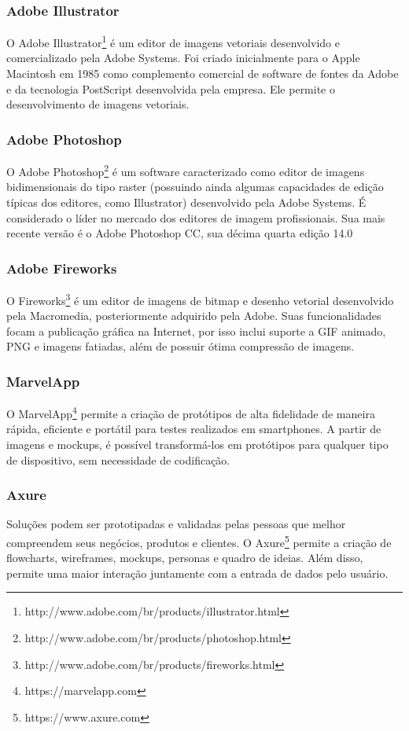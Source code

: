 \subsubsection{Adobe Illustrator}
O Adobe Illustrator\footnote{http://www.adobe.com/br/products/illustrator.html} é um editor de imagens vetoriais desenvolvido e comercializado pela Adobe Systems. Foi criado inicialmente para o Apple Macintosh em 1985 como complemento comercial de software de fontes da Adobe e da tecnologia PostScript desenvolvida pela empresa. Ele permite o desenvolvimento de imagens vetoriais.

\subsubsection{Adobe Photoshop}
O Adobe Photoshop\footnote{http://www.adobe.com/br/products/photoshop.html} é um software caracterizado como editor de imagens bidimensionais do tipo raster (possuindo ainda algumas capacidades de edição típicas dos editores, como Illustrator) desenvolvido pela Adobe Systems. É considerado o líder no mercado dos editores de imagem profissionais. Sua mais recente versão é o Adobe Photoshop CC, sua décima quarta edição 14.0

\subsubsection{Adobe Fireworks}
O Fireworks\footnote{http://www.adobe.com/br/products/fireworks.html} é um editor de imagens de bitmap e desenho vetorial desenvolvido pela Macromedia, posteriormente adquirido pela Adobe. Suas funcionalidades focam a publicação gráfica na Internet, por isso inclui suporte a GIF animado, PNG e imagens fatiadas, além de possuir ótima compressão de imagens. 

\subsubsection{MarvelApp}
 O MarvelApp\footnote{https://marvelapp.com} permite a criação de protótipos de alta fidelidade de maneira rápida, eficiente e portátil para testes realizados em smartphones. A partir de imagens e mockups, é possível transformá-los em protótipos para qualquer tipo de dispositivo, sem necessidade de codificação.

\subsubsection{Axure}
Soluções podem ser prototipadas e validadas pelas pessoas que melhor compreendem seus negócios, produtos e clientes. O Axure\footnote{https://www.axure.com} permite a criação de flowcharts, wireframes, mockups, personas e quadro de ideias. Além disso, permite uma maior interação juntamente com a entrada de dados pelo usuário.


